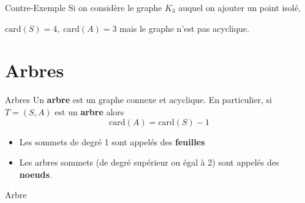 \begin{myproof}
  \begin{Example}{Contre-Exemple}{}
  Si on considère le graphe $K_3$ auquel on ajouter un point isolé,
  \begin{center}
\end{center}
$\mathrm{car d}(S) = 4,\; \mathrm{car d}(A) = 3$ mais le graphe n'est pas acyclique.
\end{Example}
\end{myproof}

\section{Arbres}

\begin{Definition}[colbacktitle=red!75!black]{Arbres}{}
Un \textbf{arbre} est un graphe connexe et acyclique. En particulier, si $T = (S,A)$ est un \textbf{arbre} alors \[
\mathrm{card} (A) = \mathrm{card} (S) - 1
\]

\begin{itemize}
    \item Les sommets de degré 1 sont appelés des \textbf{feuilles}
    \item Les arbres sommets (de degré supérieur ou égal à 2) sont appelés des \textbf{noeuds}.
\end{itemize}
\end{Definition}

\begin{Example}{Arbre}{}
\begin{center}
\end{center}
\end{Example}

